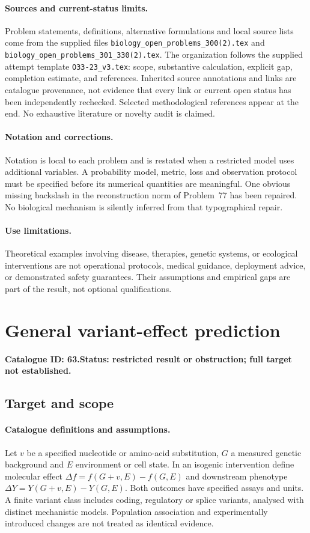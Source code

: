 \documentclass[11pt]{article}
\begin{document}
\paragraph{Sources and current-status limits.}
Problem statements, definitions, alternative formulations and local source lists
come from the supplied files
\texttt{biology\_open\_problems\_300(2).tex} and
\texttt{biology\_open\_problems\_301\_330(2).tex}.
The organization follows the supplied attempt template
\texttt{O33-23\_v3.tex}: scope, substantive calculation, explicit gap,
completion estimate, and references. Inherited source annotations and links are
catalogue provenance, not evidence that every link or current open status has
been independently rechecked. Selected methodological references appear at the
end. No exhaustive literature or novelty audit is claimed.

\paragraph{Notation and corrections.}
Notation is local to each problem and is restated when a restricted model uses
additional variables. A probability model, metric, loss and observation protocol
must be specified before its numerical quantities are meaningful. One obvious
missing backslash in the reconstruction norm of Problem~77 has been repaired.
No biological mechanism is silently inferred from that typographical repair.

\paragraph{Use limitations.}
Theoretical examples involving disease, therapies, genetic systems, or ecological
interventions are not operational protocols, medical guidance, deployment advice,
or demonstrated safety guarantees. Their assumptions and empirical gaps are part
of the result, not optional qualifications.

\setcounter{section}{62}
\section{General variant-effect prediction}
\label{prob:063}
\noindent\textbf{Catalogue ID: 63.}\quad \textbf{Status: restricted result or obstruction; full target not established.}
\subsection{Target and scope}
\paragraph{Catalogue definitions and assumptions.}
Let $v$ be a specified nucleotide or amino-acid substitution, $G$ a measured genetic background and $E$ environment or cell state. In an isogenic intervention define molecular effect $\Delta f=f(G+v,E)-f(G,E)$ and downstream phenotype $\Delta Y=Y(G+v,E)-Y(G,E)$. Both outcomes have specified assays and units. A finite variant class includes coding, regulatory or splice variants, analysed with distinct mechanistic models. Population association and experimentally introduced changes are not treated as identical evidence.
\end{document}
